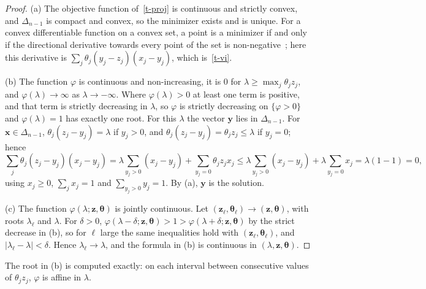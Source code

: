 \documentclass[11pt]{article}
\theoremstyle{plain}
\theoremstyle{definition}
\theoremstyle{remark}
\numberwithin{equation}{section}
\numberwithin{figure}{section}
\numberwithin{table}{section}
\begin{document}
\begin{proof}
(a) The objective function of~\eqref{t-proj} is continuous and strictly convex,
and $\Delta_{n-1}$ is compact and convex, so the minimizer exists and is
unique. For a convex differentiable function on a convex set, a point is a
minimizer if and only if the directional derivative towards every point of the
set is non-negative~\cite[Section 4.2.3]{2004Boyd_Vandenberghe}; here this
derivative is $\sum_j \theta_j(y_j-z_j)(x_j-y_j)$, which is~\eqref{t-vi}.

(b) The function $\varphi$ is continuous and non-increasing, it is
$0$ for $\lambda\ge\max_j \theta_jz_j$, and $\varphi(\lambda)\to\infty$ as
$\lambda\to-\infty$. Where $\varphi(\lambda)>0$ at least one term is positive,
and that term is strictly decreasing in $\lambda$, so $\varphi$ is strictly
decreasing on $\{\varphi>0\}$ and $\varphi(\lambda)=1$ has exactly one root.
For this $\lambda$ the vector $\bm y$ lies in $\Delta_{n-1}$. For
$\bm x\in\Delta_{n-1}$, $\theta_j(z_j-y_j)=\lambda$ if $y_j>0$, and
$\theta_j(z_j-y_j)=\theta_jz_j\le\lambda$ if $y_j=0$; hence
\begin{equation}
\sum_j \theta_j(z_j-y_j)(x_j-y_j)
=\lambda\sum_{y_j>0}(x_j-y_j)+\sum_{y_j=0}\theta_jz_jx_j
\le\lambda\sum_{y_j>0}(x_j-y_j)+\lambda\sum_{y_j=0}x_j
=\lambda\left(1-1\right)=0,
\end{equation}
using $x_j\ge 0$, $\sum_jx_j=1$ and $\sum_{y_j>0}y_j=1$. By (a), $\bm y$ is the
solution.

(c) The function $\varphi(\lambda;\bm z,\bm\theta)$ is jointly continuous. Let
$(\bm z_\ell,\bm\theta_\ell)\to(\bm z,\bm\theta)$, with roots $\lambda_\ell$ and
$\lambda$. For $\delta>0$,
$\varphi(\lambda-\delta;\bm z,\bm\theta)>1>\varphi(\lambda+\delta;\bm z,\bm\theta)$
by the strict decrease in (b), so for $\ell$ large the same inequalities hold
with $(\bm z_\ell,\bm\theta_\ell)$, and $|\lambda_\ell-\lambda|<\delta$. Hence
$\lambda_\ell\to\lambda$, and the formula in (b) is continuous in
$(\lambda,\bm z,\bm\theta)$.
\end{proof}

The root in (b) is computed exactly: on each interval between consecutive
values of $\theta_jz_j$, $\varphi$ is affine in $\lambda$.
\end{document}

